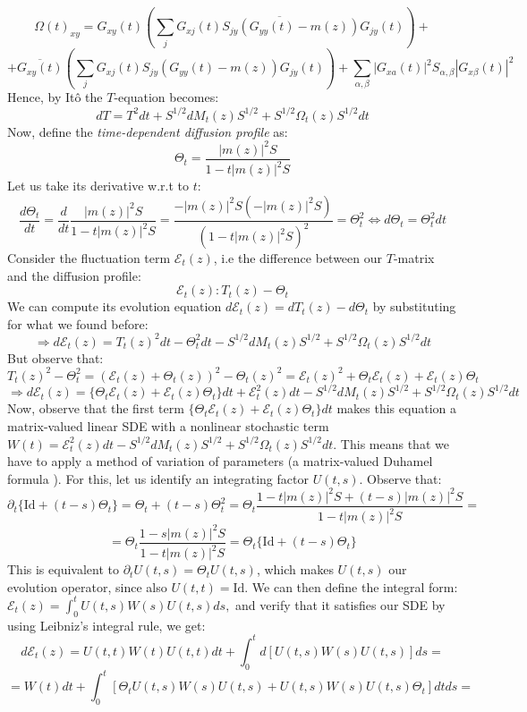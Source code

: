 \documentclass[11pt]{article}
\newcommand{\E}{\mathcal{E}}
\begin{document}
$$\Omega(t)_{xy}=G_{xy}(t)\left(\overline{\sum_j G_{xj}(t)S_{jy}(G_{yy}(t)-m(z))G_{jy}(t)}\right)+$$
$$+\overline{G_{xy}(t)}\left(\sum_j G_{xj}(t)S_{jy}(G_{yy}(t)-m(z))G_{jy}(t)\right)+\sum_{\alpha, \beta}|G_{xa}(t)|^2S_{\alpha, \beta}|G_{x\beta}(t)|^2$$
Hence, by Itô the $T$-equation becomes: 
\begin{equation*}
d{T} = {T}^2 dt + S^{1/2} dM_t(z)S^{1/2} + S^{1/2} \Omega_t(z) S^{1/2}dt \tag{3.1}
\end{equation*}
Now, define the \textit{time-dependent diffusion profile} as:$$\Theta_t = \frac{|m(z)|^2S}{1-t|m(z)|^2S}$$
Let us take its derivative w.r.t to $t$: 
$$\frac{d\Theta_t}{dt} = \frac{d}{dt}\frac{|m(z)|^2S}{1-t|m(z)|^2S} = \frac{-|m(z)|^2S(-|m(z)|^2S)}{(1-t|m(z)|^2S)^2} = \Theta_t^2 \Leftrightarrow d\Theta_t = \Theta_t^2 dt$$
Consider the fluctuation term $\mathcal{E}_t(z)$, i.e the difference between our $T$-matrix and the diffusion profile:
$$\E_t(z):T_t(z)-\Theta_t$$
We can compute its evolution equation $d\E_t(z) = dT_t(z)-d\Theta_t$ by substituting for what we found before:
$$\Rightarrow d\E_t(z) = T_t(z)^2dt - \Theta_t^2dt-S^{1/2}dM_t(z)S^{1/2}+S^{1/2}\Omega_t(z)S^{1/2}dt$$
But observe that:
$$T_t(z)^2-\Theta_t^2 =(\E_t(z)+\Theta_t(z))^2- \Theta_t(z)^2=\E_t(z)^2+\Theta_t\E_t(z)+\E_t(z)\Theta_t$$
\begin{equation*}\Rightarrow d\E_t(z)=\{\Theta_t \E_t(z)+\E_t(z)\Theta_t\}dt +\E_t^2(z)dt - S^{1/2} dM_t(z)S^{1/2} + S^{1/2}
 \Omega_t(z) S^{1/2}dt\tag{3.2}\end{equation*}
Now, observe that the first term $\{\Theta_t \E_t(z)+\E_t(z)\Theta_t\}dt$ makes this equation a matrix-valued linear SDE with a nonlinear stochastic term $W(t) = \E_t^2(z)dt - S^{1/2} dM_t(z)S^{1/2} + S^{1/2} \Omega_t(z) S^{1/2}dt$. This means that we have to apply a method of variation of parameters (a matrix-valued Duhamel formula \cite{bandSDE}). For this, let us identify an integrating factor $U(t, s)$. Observe that: 
$$\partial_{t}\{\text{Id}+(t-s)\Theta_t\} = \Theta_t+(t-s)\Theta_t^2=\Theta_t\frac{1-t|m(z)|^2S+(t-s)|m(z)|^2S}{1-t|m(z)|^2S}=$$
$$=\Theta_t \frac{1-s|m(z)|^2S}{1-t|m(z)|^2S}=\Theta_t\{\text{Id}+(t-s)\Theta_t\}$$
This is equivalent to $\partial_t U(t, s) = \Theta_t U(t, s)$, which makes $U(t, s)$ our evolution operator, since also $U(t, t) = \text{Id}$. We can then define the integral form: $\E_t(z) = \int_0^t U(t, s) W(s) U(t, s)ds,$ and verify that it satisfies our SDE by using Leibniz's integral rule, we get:
$$d\E_t(z) = U(t, t) W(t) U(t, t)dt + \int_0^t d\left[U(t, s)W(s)U(t, s)\right]ds=$$
$$=W(t)dt + \int_0^t\left[\Theta_t U(t, s) W(s) U(t, s) + U(t, s)W(s)U(t, s)\Theta_t\right]dtds =$$
\end{document}
